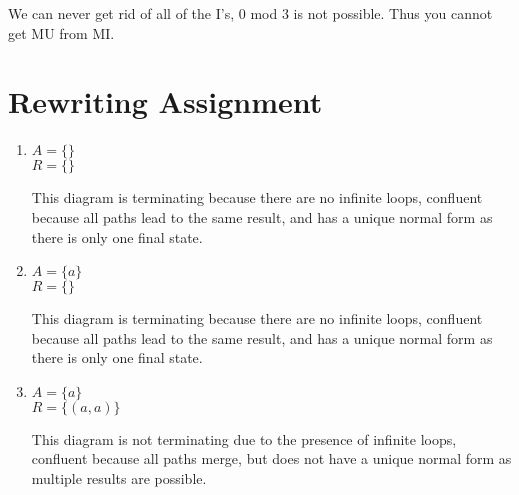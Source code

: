 \documentclass{article}
\begin{document}
We can never get rid of all of the I's, 0 mod 3 is not possible. Thus you cannot get MU from MI.

\newpage

\section{Rewriting Assignment}

\begin{enumerate}
    \item $A = \{ \}$ \\
    \hspace*{1em} $R = \{ \}$

    \begin{center}
        \end{center}
    This diagram is terminating because there are no infinite loops, confluent because all paths lead to the same result, and has a unique normal form as there is only one final state.

    \item $A = \{ a \}$ \\
    \hspace*{1em} $R = \{ \}$

    \begin{center}
    \end{center}
    This diagram is terminating because there are no infinite loops, confluent because all paths lead to the same result, and has a unique normal form as there is only one final state.

    \item $A = \{ a \}$ \\
    \hspace*{1em} $R = \{ (a,a) \}$

    \begin{center}
    \end{center}
    This diagram is not terminating due to the presence of infinite loops, confluent because all paths merge, but does not have a unique normal form as multiple results are possible.


\end{enumerate}
\end{document}
